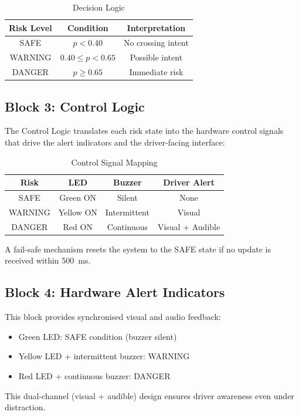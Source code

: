 \documentclass[conference]{IEEEtran}
\begin{document}
\begin{table}[h]
\centering
\caption{Decision Logic}
\label{tab:decision_logic}
\begin{tabular}{|c|c|c|}
\hline
\textbf{Risk Level} & \textbf{Condition} & \textbf{Interpretation} \\ \hline
SAFE & $p < 0.40$ & No crossing intent \\ \hline
WARNING & $0.40 \leq p < 0.65$ & Possible intent \\ \hline
DANGER & $p \geq 0.65$ & Immediate risk \\ \hline
\end{tabular}
\end{table}

\subsection{Block 3: Control Logic}
The Control Logic translates each risk state into the hardware control signals that drive the alert indicators and the driver-facing interface:

\begin{table}[h]
\centering
\caption{Control Signal Mapping}
\label{tab:control_mapping}
\begin{tabular}{|c|c|c|c|}
\hline
\textbf{Risk} & \textbf{LED} & \textbf{Buzzer} & \textbf{Driver Alert} \\ \hline
SAFE & Green ON & Silent & None \\ \hline
WARNING & Yellow ON & Intermittent & Visual \\ \hline
DANGER & Red ON & Continuous & Visual + Audible \\ \hline
\end{tabular}
\end{table}

A fail-safe mechanism resets the system to the SAFE state if no update is received within 500~ms.

\subsection{Block 4: Hardware Alert Indicators}
This block provides synchronised visual and audio feedback:
\begin{itemize}
    \item Green LED: SAFE condition (buzzer silent)
    \item Yellow LED + intermittent buzzer: WARNING
    \item Red LED + continuous buzzer: DANGER
\end{itemize}
This dual-channel (visual + audible) design ensures driver awareness even under distraction.
\end{document}

